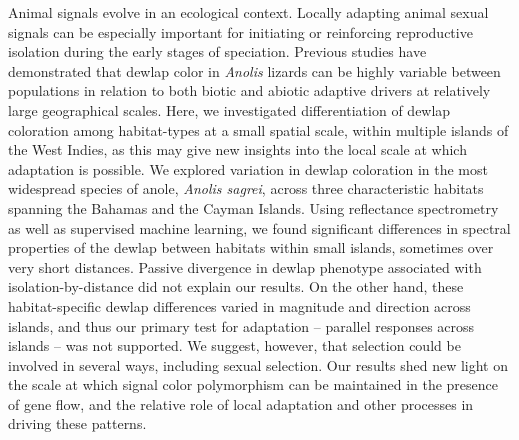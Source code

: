 Animal signals evolve in an ecological context. Locally adapting animal sexual signals can be especially important for initiating or reinforcing reproductive isolation during the early stages of speciation. Previous studies have demonstrated that dewlap color in \textit{Anolis} lizards can be highly variable between populations in relation to both biotic and abiotic adaptive drivers at relatively large geographical scales. Here, we investigated differentiation of dewlap coloration among habitat-types at a small spatial scale, within multiple islands of the West Indies, as this may give new insights into the local scale at which adaptation is possible. We explored variation in dewlap coloration in the most widespread species of anole, \textit{Anolis sagrei}, across three characteristic habitats spanning the Bahamas and the Cayman Islands. Using reflectance spectrometry as well as supervised machine learning, we found significant differences in spectral properties of the dewlap between habitats within small islands, sometimes over very short distances. Passive divergence in dewlap phenotype associated with isolation-by-distance did not explain our results. On the other hand, these habitat-specific dewlap differences varied in magnitude and direction across islands, and thus our primary test for adaptation -- parallel responses across islands -- was not supported. We suggest, however, that selection could be involved in several ways, including sexual selection. Our results shed new light on the scale at which signal color polymorphism can be maintained in the presence of gene flow, and the relative role of local adaptation and other processes in driving these patterns.

